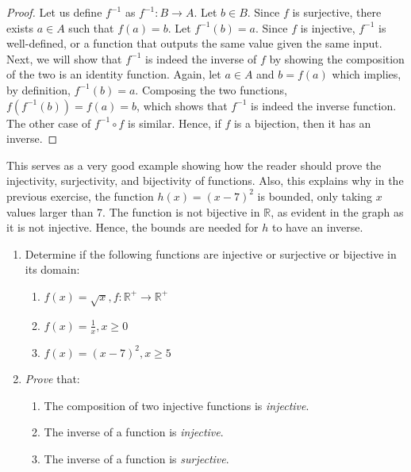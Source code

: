 \begin{proof}
  Let us define \(f^{-1}\) as \(f^{-1}: B \to A\). Let \(b \in B\). Since \(f\) is surjective, there exists \(a \in A\) such that \(f(a)=b\). Let \(f^{-1}(b)=a\). Since \(f\) is injective, \(f^{-1}\) is well-defined, or a function that outputs the same value given the same input. Next, we will show that \(f^{-1}\) is indeed the inverse of \(f\) by showing the composition of the two is an identity function. Again, let \(a \in A\) and \(b=f(a)\) which implies, by definition, \(f^{-1}(b)=a\). Composing the two functions, \(f(f^{-1}(b))=f(a)=b\), which shows that \(f^{-1}\) is indeed the inverse function. The other case of \(f^{-1} \circ f\) is similar. Hence, if \(f\) is a bijection, then it has an inverse.
\end{proof}
\begin{remark}
  This serves as a very good example showing how the reader should prove the injectivity, surjectivity, and bijectivity of functions. Also, this explains why in the previous exercise, the function \(h(x)=(x-7)^2\) is bounded, only taking \(x\) values larger than 7. The function is not bijective in \(\mathbb{R}\), as evident in the graph as it is not injective. Hence, the bounds are needed for \(h\) to have an inverse.
\begin{marginfigure}
    \centering
    \caption{Plot of \((x-7)^2\)}
  \end{marginfigure}
\end{remark}
\begin{Exercise}
  \begin{enumerate}
    \item{Determine if the following functions are injective or surjective or bijective in its domain:
      \begin{enumerate}
        \item{\(f(x)=\sqrt{x}, f: \mathbb{R}^{+} \to \mathbb{R}^{+}\)}
        \item{\(f(x)=\frac{1}{x}, x \geq 0\)}
        \item{\(f(x)=(x-7)^2, x \geq 5\)}
    \end{enumerate}}
  \item{\textit{Prove} that:
        \begin{enumerate}
          \item{The composition of two injective functions is \textit{injective}.}
          \item{The inverse of a function is \textit{injective}.}
          \item{The inverse of a function is \textit{surjective}.}
        \end{enumerate}
    }
  \end{enumerate}  
  
\end{Exercise}

